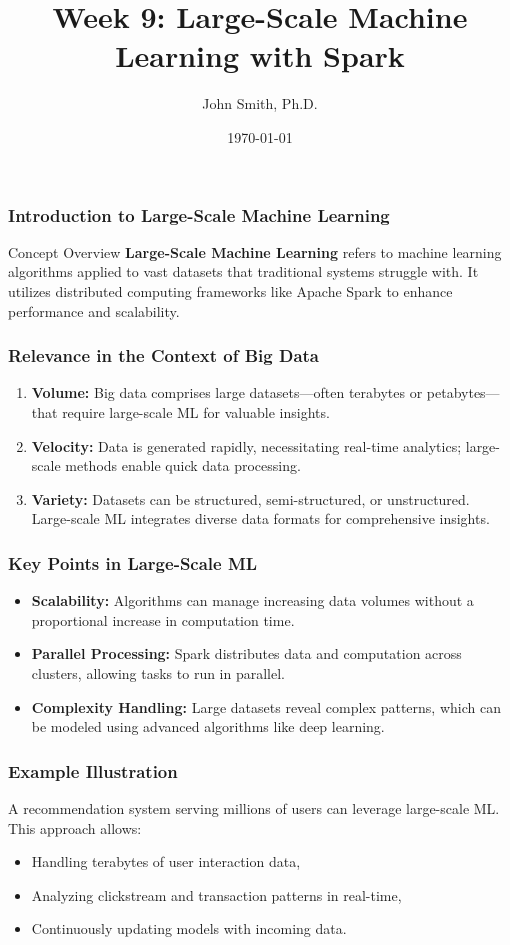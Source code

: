 \documentclass[aspectratio=169]{beamer}
\title[Large-Scale Machine Learning with Spark]{Week 9: Large-Scale Machine Learning with Spark}
\author[J. Smith]{John Smith, Ph.D.}
\institute[University Name]{
  Department of Computer Science\\
  University Name\\
  \vspace{0.3cm}
  Email: email@university.edu\\
  Website: www.university.edu
}
\date{\today}
\begin{document}
\frame{\titlepage}

\begin{frame}[fragile]
    \frametitle{Introduction to Large-Scale Machine Learning}
    \begin{block}{Concept Overview}
        \textbf{Large-Scale Machine Learning} refers to machine learning algorithms applied to vast datasets that traditional systems struggle with. 
        It utilizes distributed computing frameworks like Apache Spark to enhance performance and scalability.
    \end{block}
\end{frame}

\begin{frame}[fragile]
    \frametitle{Relevance in the Context of Big Data}
    \begin{enumerate}
        \item \textbf{Volume:} Big data comprises large datasets—often terabytes or petabytes—that require large-scale ML for valuable insights.
        \item \textbf{Velocity:} Data is generated rapidly, necessitating real-time analytics; large-scale methods enable quick data processing.
        \item \textbf{Variety:} Datasets can be structured, semi-structured, or unstructured. Large-scale ML integrates diverse data formats for comprehensive insights.
    \end{enumerate}
\end{frame}

\begin{frame}[fragile]
    \frametitle{Key Points in Large-Scale ML}
    \begin{itemize}
        \item \textbf{Scalability:} Algorithms can manage increasing data volumes without a proportional increase in computation time.
        \item \textbf{Parallel Processing:} Spark distributes data and computation across clusters, allowing tasks to run in parallel.
        \item \textbf{Complexity Handling:} Large datasets reveal complex patterns, which can be modeled using advanced algorithms like deep learning.
    \end{itemize}
\end{frame}

\begin{frame}[fragile]
    \frametitle{Example Illustration}
    A recommendation system serving millions of users can leverage large-scale ML. This approach allows:
    \begin{itemize}
        \item Handling terabytes of user interaction data,
        \item Analyzing clickstream and transaction patterns in real-time,
        \item Continuously updating models with incoming data.
    \end{itemize}
\end{frame}
\end{document}
